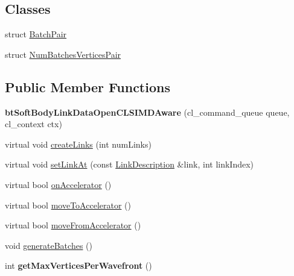 \subsection*{Classes}
\begin{DoxyCompactItemize}
\item 
struct \hyperlink{structbtSoftBodyLinkDataOpenCLSIMDAware_1_1BatchPair}{Batch\+Pair}
\item 
struct \hyperlink{structbtSoftBodyLinkDataOpenCLSIMDAware_1_1NumBatchesVerticesPair}{Num\+Batches\+Vertices\+Pair}
\end{DoxyCompactItemize}
\subsection*{Public Member Functions}
\begin{DoxyCompactItemize}
\item 
\mbox{\label{classbtSoftBodyLinkDataOpenCLSIMDAware_ae2bb335b68de0888086496e38f6208b7}} 
{\bfseries bt\+Soft\+Body\+Link\+Data\+Open\+C\+L\+S\+I\+M\+D\+Aware} (cl\+\_\+command\+\_\+queue queue, cl\+\_\+context ctx)
\item 
virtual void \hyperlink{classbtSoftBodyLinkDataOpenCLSIMDAware_a43ee8b9067c214c87e073057a63071ba}{create\+Links} (int num\+Links)
\item 
virtual void \hyperlink{classbtSoftBodyLinkDataOpenCLSIMDAware_a9a1482f91ff8105f41a1f991e183e120}{set\+Link\+At} (const \hyperlink{classbtSoftBodyLinkData_1_1LinkDescription}{Link\+Description} \&link, int link\+Index)
\item 
virtual bool \hyperlink{classbtSoftBodyLinkDataOpenCLSIMDAware_a5016c89bbdf9c87283c138d629f34601}{on\+Accelerator} ()
\item 
virtual bool \hyperlink{classbtSoftBodyLinkDataOpenCLSIMDAware_a37ded0994aded2026babb6c35838af75}{move\+To\+Accelerator} ()
\item 
virtual bool \hyperlink{classbtSoftBodyLinkDataOpenCLSIMDAware_a9eed0794cbaa4b7f0c8dd1fc5570c15f}{move\+From\+Accelerator} ()
\item 
void \hyperlink{classbtSoftBodyLinkDataOpenCLSIMDAware_afe1f0f82b680db86b53f86711444e5e0}{generate\+Batches} ()
\item 
\mbox{\label{classbtSoftBodyLinkDataOpenCLSIMDAware_aaa92ad2be3e876c9f166c25359428782}} 
int {\bfseries get\+Max\+Vertices\+Per\+Wavefront} ()

\end{DoxyCompactItemize}
